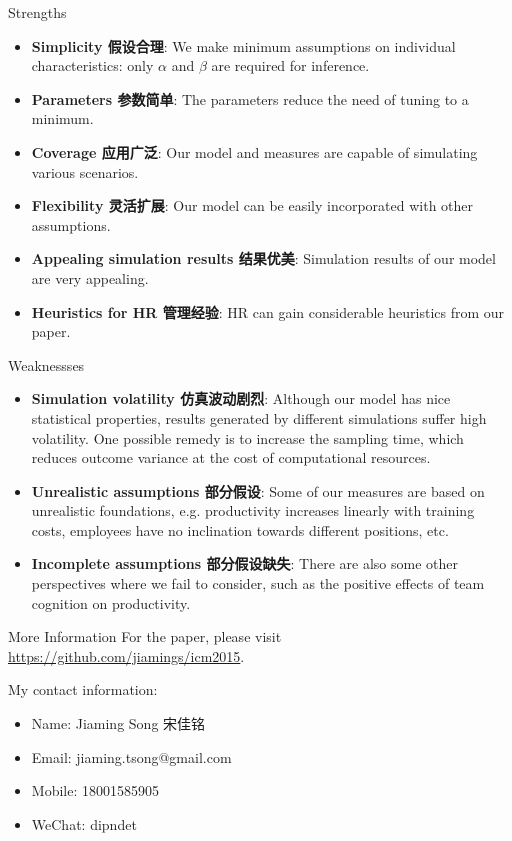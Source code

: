 \documentclass{beamer}
\begin{document}
\begin{CJK*}{UTF8}{gbsn}
\begin{frame}{Strengths}
\begin{itemize}
\item \textbf{Simplicity 假设合理}: We make minimum assumptions on individual characteristics: only $\alpha$ and $\beta$ are required for inference. 
\item \textbf{Parameters 参数简单}: The parameters reduce the need of tuning to a minimum.
\item \textbf{Coverage 应用广泛}: Our model and measures are capable of simulating various scenarios.
\item \textbf{Flexibility 灵活扩展}: Our model can be easily incorporated with other assumptions.
\item \textbf{Appealing simulation results 结果优美}: Simulation results of our model are very appealing.  
\item \textbf{Heuristics for HR 管理经验}: HR can gain considerable heuristics from our paper.
\end{itemize}
\end{frame}

\begin{frame}{Weaknessses}
\begin{itemize}
\item \textbf{Simulation volatility 仿真波动剧烈}: Although our model has nice statistical properties, results generated by different simulations suffer high volatility. One possible remedy is to increase the sampling time, which reduces outcome variance at the cost of computational resources.

\item \textbf{Unrealistic assumptions 部分假设}: Some of our measures are based on unrealistic foundations, e.g. productivity increases linearly with training costs, employees have no inclination towards different positions, etc.

\item \textbf{Incomplete assumptions 部分假设缺失}: There are also some other perspectives where we fail to consider, such as the positive effects of team cognition on productivity. 
\end{itemize}
\end{frame}

\begin{frame}{More Information}
For the paper, please visit \url{https://github.com/jiamings/icm2015}. \\\vspace{0.5em}

My contact information:
\begin{itemize}
\item Name: Jiaming Song 宋佳铭
\item Email: jiaming.tsong@gmail.com
\item Mobile: 18001585905
\item WeChat: dipndet
\end{itemize}

\end{frame}
\end{CJK*}
\end{document}
